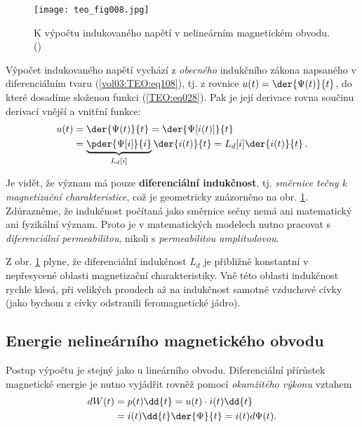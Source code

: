       \begin{figure}[ht!]  %
        \centering
        \texttt{[image: teo\_fig008.jpg]}
        \caption{K výpočtu indukovaného napětí v nelineárním magnetickém obvodu. 
                (\cite[s.~157]{Patocka4})}
        \label{teo:fig008}
      \end{figure}
      
      Výpočet indukovaného napětí vychází z \emph{obecného} indukčního zákona napsaného v 
      diferenciálním tvaru (\ref{vol03:TEO:eq108}), tj. z rovnice \(u(t) = \der{\Psi(t)}{t}\), do 
      které dosadíme složenou funkci (\ref{TEO:eq028}). Pak je její derivace rovna součinu derivací 
      vnější a vnitřní funkce:
      \begin{align}\label{TEO:eq030}
        u(t) &= \der{\Psi(t)}{t} = \der{\Psi[i(t)]}{t}                \nonumber \\
             &= \underbrace{\pder{\Psi[i]}{i}}_{L_d[i]}\der{i(t)}{t} 
              = L_d[i]\der{i(t)}{t}\,.
      \end{align}
      
      Je vidět, že význam má pouze \textbf{diferenciální indukčnost}, tj. \emph{směrnice tečny k 
      magnetizační charakteristice}, což je geometricky znázorněno na obr. \ref{teo:fig008}. 
      Zdůrazněme, že indukčnost počítaná jako směrnice sečny nemá ani matematický ani fyzikální 
      význam. Proto je v matematických modelech nutno pracovat s \emph{diferenciální 
      permeabilitou}, nikoli s \emph{permeabilitou amplitudovou}.
      
      Z obr. \ref{teo:fig008} plyne, že diferenciální indukčnost \(L_d\) je přibližně konstantní v 
      nepřesycené oblasti magnetizační charakteristiky. Vně této oblasti indukčnost rychle klesá, 
      při velikých proudech až na indukčnost samotné vzduchové cívky (jako bychom z cívky 
      odstranili feromagnetické jádro).
      
    \subsection{Energie nelineárního magnetického obvodu}
      Postup výpočtu je stejný jako u lineárního obvodu. Diferenciální přírůstek magnetické energie 
      je nutno vyjádřit rovněž pomocí \emph{okamžitého výkonu} vztahem
      \begin{align}\label{TEO:eq031}
        dW(t) &= p(t)\dd{t} = u(t)\cdot i(t)\dd{t}         \nonumber \\
              &= i(t)\dd{t}\der{\Psi}{t} = i(t)d\Psi(t).
      \end{align}

